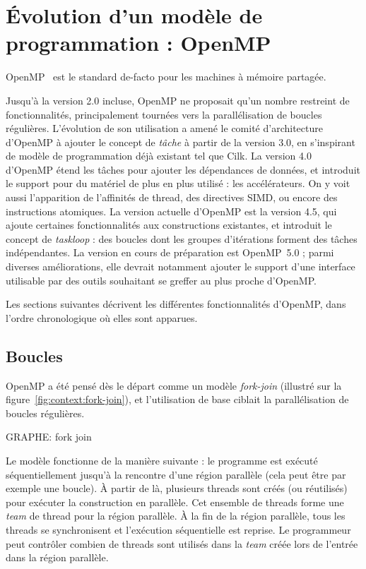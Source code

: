 \section{Évolution d'un modèle de programmation : OpenMP}\label{sec:context:openmp}

OpenMP~\cite{openmp45} est le standard de-facto pour les machines à mémoire partagée.

Jusqu'à la version 2.0 incluse, OpenMP ne proposait qu'un nombre restreint de fonctionnalités, principalement tournées vers la parallélisation de boucles régulières.
L'évolution de son utilisation a amené le comité d'architecture d'OpenMP à ajouter le concept de \emph{tâche} à partir de la version 3.0, en s'inspirant de modèle de programmation déjà existant tel que Cilk.
La version 4.0 d'OpenMP étend les tâches pour ajouter les dépendances de données, et introduit le support pour du matériel de plus en plus utilisé : les accélérateurs.
On y voit aussi l'apparition de l'affinités de thread, des directives SIMD, ou encore des instructions atomiques.
La version actuelle d'OpenMP est la version 4.5, qui ajoute certaines fonctionnalités aux constructions existantes, et introduit le concept de \emph{taskloop} : des boucles dont les groupes d'itérations forment des tâches indépendantes.
La version en cours de préparation est OpenMP~5.0 ; parmi diverses améliorations, elle devrait notamment ajouter le support d'une interface utilisable par des outils souhaitant se greffer au plus proche d'OpenMP.

Les sections suivantes décrivent les différentes fonctionnalités d'OpenMP, dans l'ordre chronologique où elles sont apparues.

\subsection{Boucles}

OpenMP a été pensé dès le départ comme un modèle \emph{fork-join} (illustré sur la figure~\ref{fig:context:fork-join}), et l'utilisation de base ciblait la parallélisation de boucles régulières.

GRAPHE: \label{fig:context:fork-join}fork join

Le modèle fonctionne de la manière suivante : le programme est exécuté séquentiellement jusqu'à la rencontre d'une région parallèle (cela peut être par exemple une boucle).
À partir de là, plusieurs threads sont créés (ou réutilisés) pour exécuter la construction en parallèle. Cet ensemble de threads forme une \emph{team} de thread pour la région parallèle.
À la fin de la région parallèle, tous les threads se synchronisent et l'exécution séquentielle est reprise.
Le programmeur peut contrôler combien de threads sont utilisés dans la \emph{team} créée lors de l'entrée dans la région parallèle.

